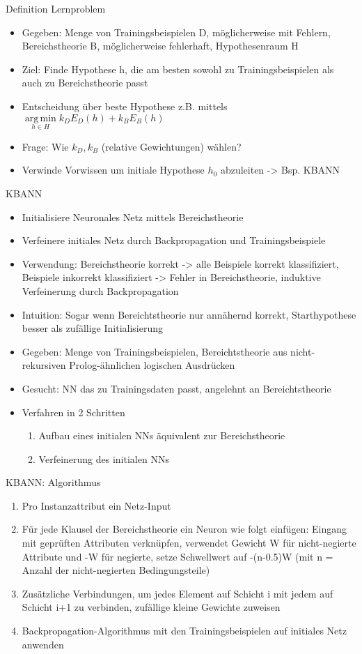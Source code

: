 \documentclass[paper=a4, fontsize=11pt]{scrartcl} %
\numberwithin{equation}{section} %
\numberwithin{figure}{section} %
\numberwithin{table}{section} %
\DeclareMathOperator*{\argmin}{arg\,min}
\begin{document}
Definition Lernproblem
\begin{itemize}
\item Gegeben: Menge von Trainingsbeispielen D, möglicherweise mit Fehlern, Bereichstheorie B, möglicherweise fehlerhaft, Hypothesenraum H
\item Ziel: Finde Hypothese h, die am besten sowohl zu Trainingsbeispielen als auch zu Bereichstheorie passt
\item Entscheidung über beste Hypothese z.B. mittels $\argmin\limits_{h \in H} k_D E_D(h) + k_B E_B(h)$
\item Frage: Wie $k_D,k_B$ (relative Gewichtungen) wählen?
\item Verwinde Vorwissen um initiale Hypothese $h_0$ abzuleiten -> Bsp. KBANN
\end{itemize}

KBANN
\begin{itemize}
\item Initialisiere Neuronales Netz mittels Bereichstheorie
\item Verfeinere initiales Netz durch Backpropagation und Trainingsbeispiele
\item Verwendung: Bereichstheorie korrekt -> alle Beispiele korrekt klassifiziert, Beispiele inkorrekt klassifiziert -> Fehler in Bereichstheorie, induktive Verfeinerung durch Backpropagation
\item Intuition: Sogar wenn Bereichtstheorie nur annähernd korrekt, Starthypothese besser als zufällige Initialisierung
\item Gegeben: Menge von Trainingsbeispielen, Bereichtstheorie aus nicht-rekursiven Prolog-ähnlichen logischen Ausdrücken
\item Gesucht: NN das zu Trainingsdaten passt, angelehnt an Bereichtstheorie
\item Verfahren in 2 Schritten
\begin{enumerate}
\item Aufbau eines initialen NNs äquivalent zur Bereichstheorie
\item Verfeinerung des initialen NNs
\end{enumerate}
\end{itemize}

KBANN: Algorithmus
\begin{enumerate}
\item Pro Instanzattribut ein Netz-Input
\item Für jede Klausel der Bereichstheorie ein Neuron wie folgt einfügen: Eingang mit geprüften Attributen verknüpfen, verwendet Gewicht W für nicht-negierte Attribute und -W für negierte, setze Schwellwert auf -(n-0.5)W (mit n = Anzahl der nicht-negierten Bedingungsteile)
\item Zusätzliche Verbindungen, um jedes Element auf Schicht i mit jedem auf Schicht i+1 zu verbinden, zufällige kleine Gewichte zuweisen
\item Backpropagation-Algorithmus mit den Trainingsbeispielen auf initiales Netz anwenden
\end{enumerate}
\end{document}
